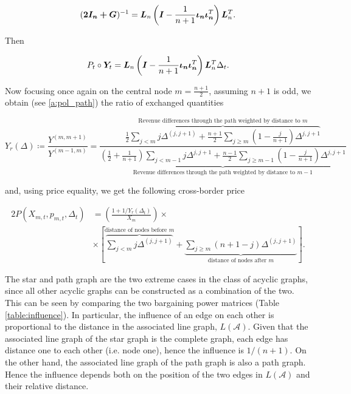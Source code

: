 \begin{equation}
  (\bm{2I_n + \bm{G}})^{-1} = \bm{L}_n  \left(\bm{I} - \frac{1}{n+1} \bm{\iota_n \iota_n}^T\right) \bm{L}_n^T.
\end{equation}

Then

\begin{equation*}
  P_t \circ \bm{Y}_t = \bm{L}_n  \left(\bm{I} - \frac{1}{n+1} \bm{\iota_n \iota_n}^T\right) \bm{L}_n^T  \Delta_t.
\end{equation*}

Now focusing once again on the central node $m = \frac{n+1}{2}$, assuming $n+1$ is odd, we obtain (see \ref{a:pol_path}) the ratio of exchanged quantities

\begin{equation}
  Y_r(\Delta) \coloneqq \frac{Y^{(m, m+1)}}{Y^{(m-1, m)}}
  = \frac{
    \overbrace{\frac{1}{2} \sum_{j < m} j \Delta^{(j, j+1)} + \frac{n+1}{2}\sum_{j \geq m} \left(1 - \frac{j}{n+1}\right) \Delta^{j, j+1}}^{\text{Revenue differences through the path weighted by distance to } m}
  }{
    \underbrace{\left(\frac{1}{2} + \frac{1}{n+1}\right) \sum_{j < m-1} j \Delta^{j, j+1}+ \frac{n-1}{2} \sum_{j \geq m-1} \left(1 - \frac{j}{n+1}\right) \Delta^{j, j+1}}_{\text{Revenue differences through the path weighted by distance to } m-1}
  }
\end{equation}

and, using price equality, we get the following cross-border price

\begin{equation} \label{policy_path}
  \begin{split}
    2 P(X_{m, t}, p_{m, t}, \Delta_t) &= \left( \frac{1 + 1 / Y_r(\Delta_t)}{X_m} \right) \times  \\
    &\times \left[ \overbrace{\sum_{j < m} j \Delta^{(j, j + 1)}}^{\text{distance of nodes before } m} +  \underbrace{\sum_{j \geq m}\left(n + 1 - j\right) \Delta^{(j, j + 1)}}_{\text{distance of nodes after } m} \right].
  \end{split}
\end{equation}

The star and path graph are the two extreme cases in the class of acyclic graphs, since all other acyclic graphs can be constructed as a combination of the two. This can be seen by comparing the two bargaining power matrices (Table \ref{table:influence}). In particular, the influence of an edge on each other is proportional to the distance in the associated line graph, $L(\mathcal{A})$. Given that the associated line graph of the star graph is the complete graph, each edge has distance one to each other (i.e. node one), hence the influence is $1 / (n+1)$. On the other hand, the associated line graph of the path graph is also a path graph. Hence the influence depends both on the position of the two edges in $L(\mathcal{A})$ and their relative distance.

